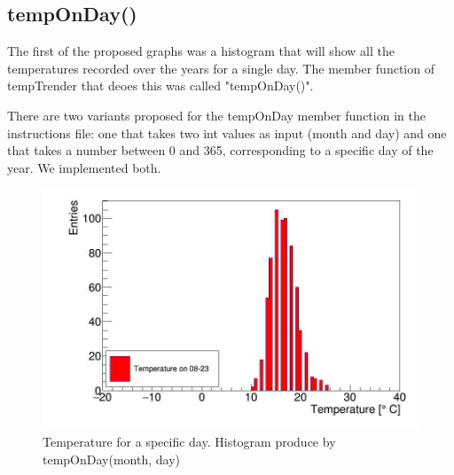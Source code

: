 
\subsection{tempOnDay()}
The first of the proposed graphs was a histogram that will show all the temperatures recorded over the years for a single day. The member function of tempTrender that deoes this was called "tempOnDay()".\par
There are two variants proposed for the tempOnDay member function in the instructions file: one that takes two int values as input (month and day) and one that takes a number between 0 and 365, corresponding to a specific day of the year. We implemented both.\par

\begin{figure}[h]
\centering
\includegraphics[scale=0.3]{graph1.png}
\caption{Temperature for a specific day. Histogram produce by tempOnDay(month, day) }
\end{figure}